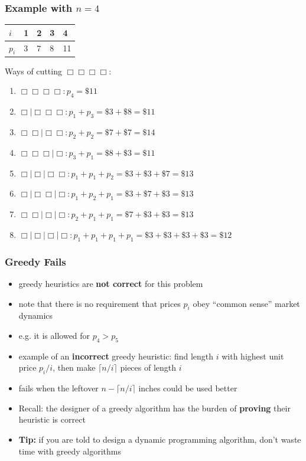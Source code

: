 \documentclass[10pt,aspectratio=169]{beamer}
\begin{document}
\begin{frame} \frametitle{Example with $n=4$}
\begin{center}
  \begin{tabular}{|l|l|l|l|l|} \hline
    $i$ & 1 & 2 & 3 & 4 \\ \hline
    $p_i$ & 3 & 7 & 8 & 11 \\ \hline
  \end{tabular}
\end{center}

Ways of cutting $\Box\Box\Box\Box$:
\begin{enumerate}
  \item $\Box\Box\Box\Box : p_4 = \$ 11$
  \item $\Box \mid \Box\Box\Box : p_1 + p_3 = \$3 + \$8 = \$11$
  \item $\Box\Box \mid \Box\Box : p_2 + p_2 = \$7 + \$7 = \$14$
  \item $\Box\Box\Box \mid \Box : p_3 + p_1 = \$8 + \$3 = \$11$
  \item $\Box \mid \Box \mid \Box\Box : p_1 + p_1 + p_2 = \$3 + \$3 + \$7 = \$13$
  \item $\Box \mid \Box\Box \mid \Box : p_1 + p_2 + p_1 = \$3 + \$7 + \$3 = \$13$
  \item $\Box\Box \mid \Box \mid \Box : p_2 + p_1 + p_1 = \$7 + \$3 + \$3 = \$13$
  \item $\Box \mid \Box \mid \Box \mid \Box : p_1 + p_1 + p_1 + p_1 = \$3 + \$3 + \$3 + \$3 = \$12$
\end{enumerate}

\end{frame}

\begin{frame} \frametitle{Greedy Fails}
\begin{itemize}
  \item greedy heuristics are \textbf{not correct} for this problem
  \item note that there is no requirement that prices $p_i$ obey ``common sense'' market dynamics
  \item e.g. it is allowed for $p_4 > p_5$
  \item example of an \textbf{incorrect} greedy heuristic: find length $i$ with highest unit price $p_i/i$, then make $\lceil n/i \rceil$ pieces of length $i$
  \item fails when the leftover $n-\lceil n/i \rceil$ inches could be used better
  \item Recall: the designer of a greedy algorithm has the burden of \textbf{proving} their heuristic is correct
  \item \textbf{Tip:} if you are told to design a dynamic programming algorithm, don't waste time with greedy algorithms
\end{itemize}
\end{frame}
\end{document}
